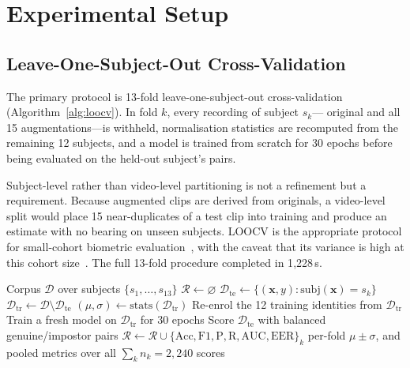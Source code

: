 \documentclass[journal]{IEEEtran}
\begin{document}
\section{Experimental Setup}
\label{sec:setup}

\subsection{Leave-One-Subject-Out Cross-Validation}

The primary protocol is 13-fold leave-one-subject-out cross-validation
(Algorithm~\ref{alg:loocv}). In fold $k$, every recording of subject $s_k$---%
original and all 15 augmentations---is withheld, normalisation statistics are
recomputed from the remaining 12 subjects, and a model is trained from scratch
for 30 epochs before being evaluated on the held-out subject's pairs.

Subject-level rather than video-level partitioning is not a refinement but a
requirement. Because augmented clips are derived from originals, a video-level
split would place 15 near-duplicates of a test clip into training and produce
an estimate with no bearing on unseen subjects. LOOCV is the appropriate
protocol for small-cohort biometric evaluation~\cite{iso19795}, with the caveat
that its variance is high at this cohort size~\cite{varoquaux_small}. The full
13-fold procedure completed in 1{,}228\,s.

\begin{algorithm}[!t]
\caption{Leave-One-Subject-Out Evaluation}
\label{alg:loocv}
\begin{algorithmic}[1]
\REQUIRE Corpus $\mathcal{D}$ over subjects $\{s_1,\dots,s_{13}\}$
\STATE $\mathcal{R} \leftarrow \varnothing$
  \STATE $\mathcal{D}_{\text{te}} \leftarrow
         \{(\mathbf{x},y) : \mathrm{subj}(\mathbf{x}) = s_k\}$
  \STATE $\mathcal{D}_{\text{tr}} \leftarrow
         \mathcal{D} \setminus \mathcal{D}_{\text{te}}$
  \STATE $(\mu,\sigma) \leftarrow
         \mathrm{stats}(\mathcal{D}_{\text{tr}})$
  \STATE Re-enrol the 12 training identities from $\mathcal{D}_{\text{tr}}$
  \STATE Train a fresh model on $\mathcal{D}_{\text{tr}}$ for 30 epochs
  \STATE Score $\mathcal{D}_{\text{te}}$ with balanced genuine/impostor pairs
  \STATE $\mathcal{R} \leftarrow \mathcal{R} \cup
         \{\mathrm{Acc},\mathrm{F1},\mathrm{P},\mathrm{R},
         \mathrm{AUC},\mathrm{EER}\}_k$
\ENDFOR
\RETURN per-fold $\mu \pm \sigma$, and pooled metrics over all
        $\sum_k n_k = 2{,}240$ scores
\end{algorithmic}
\end{algorithm}
\end{document}

